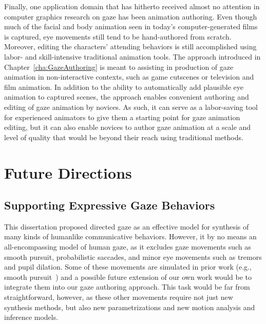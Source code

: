 Finally, one application domain that has hitherto received almost no attention in computer graphics research on gaze has been animation authoring. Even though much of the facial and body animation seen in today's computer-generated films is captured, eye movements still tend to be hand-authored from scratch. Moreover, editing the characters' attending behaviors is still accomplished using labor- and skill-intensive traditional animation tools. The approach introduced in Chapter~\ref{cha:GazeAuthoring} is meant to assisting in production of gaze animation in non-interactive contexts, such as game cutscenes or television and film animation. In addition to the ability to automatically add plausible eye animation to captured scenes, the approach enables convenient authoring and editing of gaze animation by novices. As such, it can serve as a labor-saving tool for experienced animators to give them a starting point for gaze animation editing, but it can also enable novices to author gaze animation at a scale and level of quality that would be beyond their reach using traditional methods.

\section{Future Directions}

\subsection{Supporting Expressive Gaze Behaviors}

This dissertation proposed directed gaze as an effective model for synthesis of many kinds of humanlike communicative behaviors. However, it by no means an all-encompassing model of human gaze, as it excludes gaze movements such as smooth pursuit, probabilistic saccades, and minor eye movements such as tremors and pupil dilation. Some of these movements are simulated in prior work (e.g., smooth pursuit~\citep{yeo2012eyecatch}) and a possible future extension of our own work would be to integrate them into our gaze authoring approach. This task would be far from straightforward, however, as these other movements require not just new synthesis methods, but also new parametrizations and new motion analysis and inference models.

